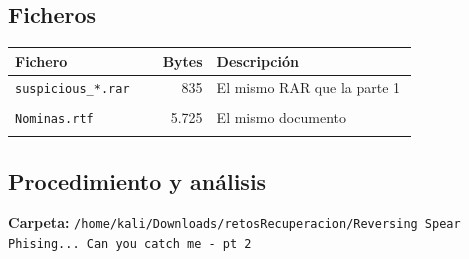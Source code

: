 \documentclass[11pt,a4paper]{article}
\begin{document}
\subsection{Ficheros}
\begin{longtable}{@{}L{0.30\linewidth}r L{0.50\linewidth}@{}}
\toprule \textbf{Fichero} & \textbf{Bytes} & \textbf{Descripción} \\ \midrule \endhead
\texttt{suspicious\_\allowbreak{}*.rar} & 835 & El mismo RAR que la parte 1 \\ \nopagebreak
{} \\ \midrule
\texttt{Nominas.rtf} & 5.725 & El mismo documento \\ \nopagebreak
{} \\ \midrule
\end{longtable}


\subsection{Procedimiento y análisis}

\noindent\textbf{Carpeta:} \texttt{/\allowbreak{}home/\allowbreak{}kali/\allowbreak{}Downloads/\allowbreak{}retosRecuperacion/\allowbreak{}Reversing Spear Phising... Can you catch me - pt 2}
\end{document}
